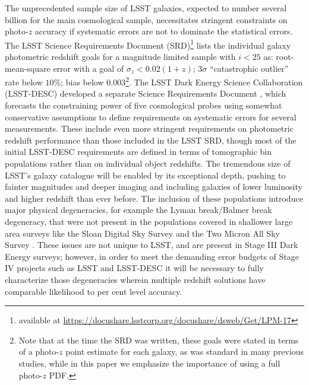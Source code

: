 The unprecedented sample size of LSST galaxies, expected to number several billion for the main cosmological sample, necessitates stringent constraints on photo-$z$ accuracy if systematic errors are not to dominate the statistical errors.
The LSST Science Requirements Document (SRD)\footnote{available at \url{https://docushare.lsstcorp.org/docushare/dsweb/Get/LPM-17}} lists the individual galaxy photometric redshift goals for a magnitude limited sample with $i<25$ as: root-mean-square error with a goal of $\sigma_z<0.02(1+z)$; $3\sigma$ ``catastrophic outlier'' rate below $10\%$; bias below $0.003$\footnote{
Note that at the time the SRD was written, these goals were stated in terms of a photo-$z$ point estimate for each galaxy, as was standard in many previous studies, while in this paper we emphasize the importance of using a full photo-$z$ PDF.}.  The LSST Dark Energy Science Collaboration (LSST-DESC) developed a separate Science Requirements Document \citep{Mandelbaum:2018}, which forecasts the constraining power of five cosmological probes using somewhat conservative assumptions to define requirements on systematic errors for several measurements.  These include even more stringent requirements on photometric redshift performance than those included in the LSST SRD, though most of the initial LSST-DESC requirements are defined in terms of tomographic bin populations rather than on individual object redshifts.  The tremendous size of LSST's galaxy catalogue will be enabled by its exceptional depth, pushing to fainter magnitudes and deeper imaging and including galaxies of lower luminosity and higher redshift than ever before.
The inclusion of these populations introduce major physical degeneracies, for example the Lyman break/Balmer break degeneracy, that were not present in the populations covered in shallower large area surveys like the Sloan Digital Sky Survey \citep[SDSS,][]{York:00} and the Two Micron All Sky Survey \citep[2MASS,][]{Skrutskie:06}.  These issues are not unique to LSST, and are present in Stage III Dark Energy surveys; however,
in order to meet the demanding error budgets of Stage IV projects such as LSST and LSST-DESC it will be necessary to fully characterize those degeneracies wherein multiple redshift solutions have comparable likelihood to per cent level accuracy.

